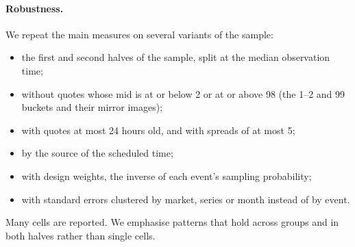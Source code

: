 \paragraph{Robustness.}
We repeat the main measures on several variants of the sample:
\begin{itemize}
\item the first and second halves of the sample, split at the median observation time;
\item without quotes whose mid is at or below 2\cents{} or at or above 98\cents{} (the 1--2\cents{} and
      99\cents{} buckets and their mirror images);
\item with quotes at most 24 hours old, and with spreads of at most 5\cents;
\item by the source of the scheduled time;
\item with design weights, the inverse of each event's sampling probability;
\item with standard errors clustered by market, series or month instead of by event.
\end{itemize}
Many cells are reported. We emphasise patterns that hold across groups and in both halves rather
than single cells.
